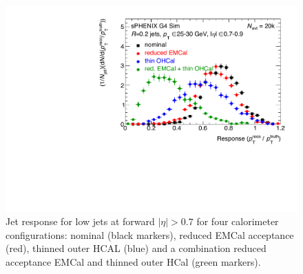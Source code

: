 \begin{figure}[hbt]
  \centering
  \includegraphics[width=0.9\linewidth]{figs/sPHENIX_JetResponse25GeV_CaloStackVariants_Nevt20k_ETABIN2}
  \caption{Jet response for low \pt jets at forward $|\eta| > 0.7$ for four calorimeter configurations:
   nominal (black markers), reduced EMCal acceptance (red), thinned outer HCAL (blue) and a combination
   reduced acceptance EMCal and thinned outer HCal (green markers).}
  \label{fig:JetResponse25GeV_CaloStackVariants_Nevt20k_ETABIN2}
\end{figure}
